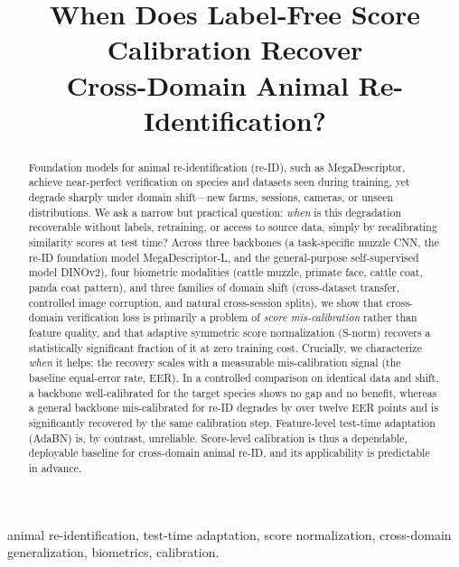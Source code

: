 \documentclass[conference]{IEEEtran}
\begin{document}
\title{When Does Label-Free Score Calibration Recover\\ Cross-Domain Animal Re-Identification?}

\author{
}

\maketitle

\begin{abstract}
Foundation models for animal re-identification (re-ID), such as MegaDescriptor, achieve
near-perfect verification on species and datasets seen during training, yet degrade sharply under
domain shift---new farms, sessions, cameras, or unseen distributions. We ask a narrow but practical
question: \emph{when} is this degradation recoverable without labels, retraining, or access to
source data, simply by recalibrating similarity scores at test time? Across three backbones
(a task-specific muzzle CNN, the re-ID foundation model MegaDescriptor-L, and the general-purpose
self-supervised model DINOv2), four biometric modalities (cattle muzzle, primate face, cattle coat,
panda coat pattern), and three families of domain shift (cross-dataset transfer, controlled image
corruption, and natural cross-session splits), we show that cross-domain verification loss is
primarily a problem of \emph{score mis-calibration} rather than feature quality, and that adaptive
symmetric score normalization (S-norm) recovers a statistically significant fraction of it at zero
training cost. Crucially, we characterize \emph{when} it helps: the recovery scales with a
measurable mis-calibration signal (the baseline equal-error rate, EER). In a controlled comparison on
identical data and shift, a backbone well-calibrated for the target species shows no gap and no
benefit, whereas a general backbone mis-calibrated for re-ID degrades by over twelve EER points and
is significantly recovered by the same calibration step. Feature-level test-time adaptation (AdaBN)
is, by contrast, unreliable. Score-level calibration is thus a dependable, deployable baseline for
cross-domain animal re-ID, and its applicability is predictable in advance.
\end{abstract}

\begin{IEEEkeywords}
animal re-identification, test-time adaptation, score normalization, cross-domain generalization,
biometrics, calibration.
\end{IEEEkeywords}
\end{document}
